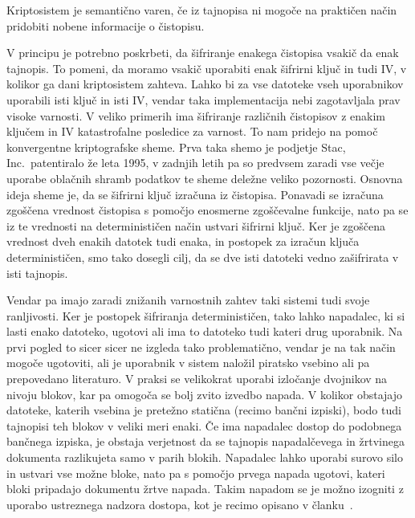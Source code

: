 \documentclass[12pt,a4paper,openany,tikz]{book}
\theoremstyle{plain}
\theoremstyle{definition}
\begin{document}
\begin{mdframed}[frametitle={Semantična varnost}]
Kriptosistem je semantično varen, če iz tajnopisa ni mogoče na praktičen način pridobiti nobene informacije o čistopisu.
\end{mdframed}

V principu je potrebno poskrbeti, da šifriranje enakega čistopisa vsakič da enak tajnopis. To pomeni, da moramo vsakič uporabiti enak šifrirni ključ in tudi \gls{IV}, v kolikor ga dani kriptosistem zahteva. Lahko bi za vse datoteke vseh uporabnikov uporabili isti ključ in isti \gls{IV}, vendar taka implementacija nebi zagotavljala prav visoke varnosti. V veliko primerih ima šifriranje različnih čistopisov z enakim ključem in IV katastrofalne posledice za varnost. To nam pridejo na pomoč konvergentne kriptografske sheme. Prva taka shemo je podjetje Stac, Inc.\ patentiralo že leta 1995, v zadnjih letih pa so predvsem zaradi vse večje uporabe oblačnih shramb podatkov te sheme deležne veliko pozornosti. Osnovna ideja sheme je, da se šifrirni ključ izračuna iz čistopisa. Ponavadi se izračuna zgoščena vrednost čistopisa s pomočjo enosmerne zgoščevalne funkcije, nato pa se iz te vrednosti na determinističen način ustvari šifrirni ključ. Ker je zgoščena vrednost dveh enakih datotek tudi enaka, in postopek za izračun ključa determinističen, smo tako dosegli cilj, da se dve isti datoteki vedno zašifrirata v isti tajnopis.

Vendar pa imajo zaradi znižanih varnostnih zahtev taki sistemi tudi svoje ranljivosti. Ker je postopek šifriranja determinističen, tako lahko napadalec, ki si lasti enako datoteko, ugotovi ali ima to datoteko tudi kateri drug uporabnik. Na prvi pogled to sicer sicer ne izgleda tako problematično, vendar je na tak način mogoče ugotoviti, ali je uporabnik v sistem naložil piratsko vsebino ali pa prepovedano literaturo. V praksi se velikokrat uporabi izločanje dvojnikov na nivoju blokov, kar pa omogoča se bolj zvito izvedbo napada. V kolikor obstajajo datoteke, katerih vsebina je pretežno statična (recimo bančni izpiski), bodo tudi tajnopisi teh blokov v veliki meri enaki. Če ima napadalec dostop do podobnega bančnega izpiska, je obstaja verjetnost da se tajnopis napadalčevega in žrtvinega dokumenta razlikujeta samo v parih blokih. Napadalec lahko uporabi surovo silo in ustvari vse možne bloke, nato pa s pomočjo prvega napada ugotovi, kateri bloki pripadajo dokumentu žrtve napada. Takim napadom se je možno izogniti z uporabo ustreznega nadzora dostopa, kot je recimo opisano v članku~\cite{keelveedhi2013dupless}.
\end{document}
